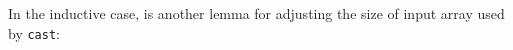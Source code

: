 \documentclass{l4proj}
\begin{document}
\begin{code}
\AgdaSymbol{(}\AgdaSpace{}%
\AgdaSymbol{\{}\AgdaSymbol{\}}\AgdaSpace{}%
\AgdaSymbol{\{}\AgdaSymbol{\}}\AgdaSpace{}%
\AgdaSymbol{\{}\AgdaSymbol{\}}\AgdaSpace{}%
\AgdaSymbol{)}\<%
\\
\>[0]\AgdaSpace{}%
\AgdaSymbol{\{}\AgdaSpace{}%
\AgdaSymbol{\}}\AgdaSpace{}%
\AgdaSymbol{\{}\AgdaSymbol{\}}\AgdaSpace{}%
\AgdaSymbol{\{}\AgdaSymbol{\}}\AgdaSpace{}%
\AgdaSymbol{(}\AgdaSpace{}%
\AgdaSpace{}%
\AgdaSymbol{)}\AgdaSpace{}%
\AgdaSymbol{=}\AgdaSpace{}%
\AgdaSpace{}%
\AgdaSymbol{(}\AgdaSpace{}%
\AgdaSymbol{)}\AgdaSpace{}%
\AgdaSymbol{(}\AgdaSpace{}%
\AgdaSymbol{\{}\AgdaSymbol{\}}\AgdaSpace{}%
\AgdaSymbol{\{}\AgdaSymbol{\}}\AgdaSpace{}%
\AgdaSymbol{\{}\AgdaSymbol{\}}\AgdaSpace{}%
\AgdaSymbol{)}\<%
\\
\>[0]\AgdaSpace{}%
\AgdaSymbol{\{}\AgdaSpace{}%
\AgdaSymbol{\}}\AgdaSpace{}%
\AgdaSymbol{\{}\AgdaSpace{}%
\AgdaSymbol{\}}\AgdaSpace{}%
\AgdaSymbol{\{}\AgdaSymbol{\}}\AgdaSpace{}%
\AgdaSymbol{(}\AgdaSpace{}%
\AgdaSpace{}%
\AgdaSymbol{)}\AgdaSpace{}%
\AgdaSymbol{=}\AgdaSpace{}%
\AgdaSpace{}%
\AgdaSymbol{(}\AgdaSpace{}%
\AgdaSymbol{)}\AgdaSpace{}%
\AgdaSymbol{(}\AgdaSpace{}%
\AgdaSymbol{\{}\AgdaSpace{}%
\AgdaSymbol{\}}\AgdaSpace{}%
\AgdaSymbol{\{}\AgdaSymbol{\}}\AgdaSpace{}%
\AgdaSymbol{\{}\AgdaSymbol{\}}\AgdaSpace{}%
\AgdaSymbol{)}\<%
\end{code}
In the inductive case,  is another lemma for adjusting the size of input array used by \texttt{cast}:
\end{document}

